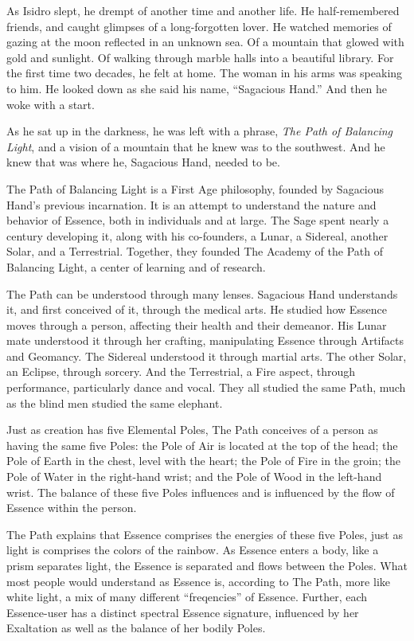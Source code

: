 
As Isidro slept, he drempt of another time and another life. He half-remembered
friends, and caught glimpses of a long-forgotten lover. He watched memories of
gazing at the moon reflected in an unknown sea. Of a mountain that glowed with
gold and sunlight. Of walking through marble halls into a beautiful library.
For the first time two decades, he felt at home. The woman in his arms was
speaking to him. He looked down as she said his name, ``Sagacious Hand.'' And
then he woke with a start.

As he sat up in the darkness, he was left with a phrase, \emph{The Path of
Balancing Light}, and a vision of a mountain that he knew was to the southwest.
And he knew that was where he, Sagacious Hand, needed to be.



The Path of Balancing Light is a First Age philosophy, founded by Sagacious
Hand's previous incarnation. It is an attempt to understand the nature and
behavior of Essence, both in individuals and at large. The Sage spent nearly a
century developing it, along with his co-founders, a Lunar, a Sidereal, another
Solar, and a Terrestrial. Together, they founded The Academy of the Path of
Balancing Light, a center of learning and of research.

The Path can be understood through many lenses. Sagacious Hand understands it,
and first conceived of it, through the medical arts. He studied how Essence
moves through a person, affecting their health and their demeanor. His Lunar
mate understood it through her crafting, manipulating Essence through Artifacts
and Geomancy. The Sidereal understood it through martial arts. The other Solar,
an Eclipse, through sorcery. And the Terrestrial, a Fire aspect, through
performance, particularly dance and vocal. They all studied the same Path, much
as the blind men studied the same elephant.

Just as creation has five Elemental Poles, The Path conceives of a person as
having the same five Poles: the Pole of Air is located at the top of the head;
the Pole of Earth in the chest, level with the heart; the Pole of Fire in the
groin; the Pole of Water in the right-hand wrist; and the Pole of Wood in the
left-hand wrist. The balance of these five Poles influences and is influenced
by the flow of Essence within the person.

The Path explains that Essence comprises the energies of these five Poles, just
as light is comprises the colors of the rainbow. As Essence enters a body, like
a prism separates light, the Essence is separated and flows between the Poles.
What most people would understand as Essence is, according to The Path, more
like white light, a mix of many different ``freqencies'' of Essence. Further,
each Essence-user has a distinct spectral Essence signature, influenced by her
Exaltation as well as the balance of her bodily Poles.


\printbibliography[title=References]


